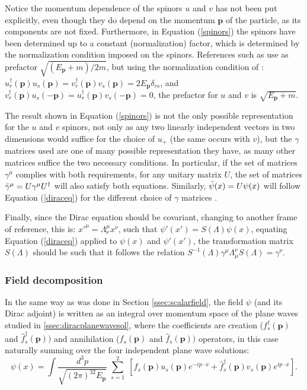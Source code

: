 Notice the momentum dependence of the spinors $u$ and $v$ has not been put explicitly, even though they do depend on the momentum $\bm{p}$ of the particle, as its components are not fixed. Furthermore, in Equation (\ref{spinors}) the spinors have been determined up to a constant (normalization) factor, which is determined by the normalization condition imposed on the spinors. References such as \cite{Mandl} use as prefactor $\sqrt{(E_{\bm{p}} + m)/2m}$, but using the normalization condition of \cite{Lahiri}: $u_r^{\dagger}(\bm{p})u_s(\bm{p}) = v_r^{\dagger}(\bm{p})v_s(\bm{p}) = 2E_{\bm{p}}\delta_{rs}$, and $v_r^{\dagger}(\bm{p})u_s(-\bm{p}) = u_r^{\dagger}(\bm{p})v_s(-\bm{p}) = 0$, the prefactor for $u$ and $v$ is $\sqrt{E_{\bm{p}} + m}$.

The result shown in Equation (\ref{spinors}) is not the only possible representation for the $u$ and $v$ spinors, not only as any two linearly independent vectors in two dimensions would suffice for the choice of $u_+$ (the same occurs with $v$), but the $\gamma$ matrices used are one of many possible representation they have, as many other matrices suffice the two necessary conditions. In particular, if the set of matrices $\gamma^{\mu}$ complies with both requirements, for any unitary matrix $U$, the set of matrices $\Bar{\gamma}^{\mu} = U\gamma^{\mu}U^{\dagger}$ will also satisfy both equations. Similarly, $\Bar{\psi}(x) = U\psi(x)$ will follow Equation (\ref{diraceq}) for the different choice of $\gamma$ matrices \cite{Lahiri}. 

Finally, since the Dirac equation should be covariant, changing to another frame of reference, this is: $x'^{\mu} = \Lambda^{\mu}_{\nu}x^{\nu}$, such that $\psi'(x') = S(\Lambda)\psi(x)$, equating Equation (\ref{diraceq}) applied to $\psi(x)$ and $\psi'(x')$, the transformation matrix $S(\Lambda)$ should be such that it follows the relation $S^{-1}(\Lambda)\gamma^{\mu}\Lambda^{\nu}_{\mu}S(\Lambda) = \gamma^{\nu}$.

\subsubsection{Field decomposition} \label{ssec:diracdecomp}

In the same way as was done in Section \ref{ssec:scalarfield}, the field $\psi$ (and its Dirac adjoint) is written as an integral over momentum space of the plane waves studied in \ref{ssec:diracplanewavesol}, where the coefficients are creation ($f^{\dagger}_s(\bm{p})$ and $\hat{f}^{\dagger}_s(\bm{p}))$ and annihilation ($f_s(\bm{p})$ and $\hat{f}_s(\bm{p}))$ operators, in this case naturally summing over the four independent plane wave solutions:
\begin{equation}
    \psi(x) = \int \dfrac{d^3p}{\sqrt{(2\pi)^32E_{\bm{p}}}} \; \sum_{s=1}^2 \; [f_s(\bm{p})u_s(\bm{p})e^{-ip\cdot x} + \hat{f}^{\dagger}_s(\bm{p})v_s(\bm{p})e^{ip\cdot x}].
\end{equation}

